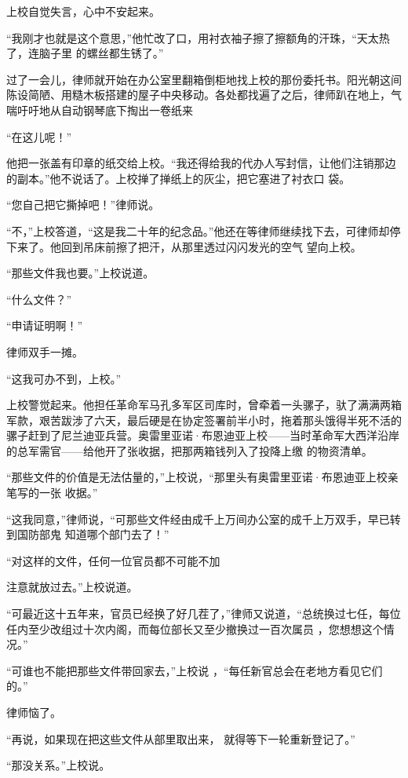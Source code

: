 \documentclass{article}
\begin{document}
上校自觉失言，心中不安起来。 

“我刚才也就是这个意思，”他忙改了口，用衬衣袖子擦了擦额角的汗珠，“天太热了，连脑子里
的螺丝都生锈了。” 

过了一会儿，律师就开始在办公室里翻箱倒柜地找上校的那份委托书。阳光朝这间陈设简陋、用糙木板搭建的屋子中央移动。各处都找遍了之后，律师趴在地上，气喘吁吁地从自动钢琴底下掏出一卷纸来

\newpage


“在这儿呢！” 

他把一张盖有印章的纸交给上校。“我还得给我的代办人写封信，让他们注销那边的副本。”他不说话了。上校掸了掸纸上的灰尘，把它塞进了衬衣口
袋。 


“您自己把它撕掉吧！”律师说。 

“不，”上校答道，“这是我二十年的纪念品。”他还在等律师继续找下去，可律师却停下来了。他回到吊床前擦了把汗，从那里透过闪闪发光的空气
望向上校。 


“那些文件我也要。”上校说道。 


“什么文件？” 


“申请证明啊！” 


\newpage

律师双手一摊。 


“这我可办不到，上校。” 

上校警觉起来。他担任革命军马孔多军区司库时，曾牵着一头骡子，驮了满满两箱军款，艰苦跋涉了六天，最后硬是在协定签署前半小时，拖着那头饿得半死不活的骡子赶到了尼兰迪亚兵营。奥雷里亚诺·布恩迪亚上校——当时革命军大西洋沿岸的总军需官——给他开了张收据，把那两箱钱列入了投降上缴
的物资清单。 

“那些文件的价值是无法估量的，”上校说，“那里头有奥雷里亚诺·布恩迪亚上校亲笔写的一张
收据。” 

“这我同意，”律师说，“可那些文件经由成千上万间办公室的成千上万双手，早已转到国防部鬼
知道哪个部门去了！” 

“对这样的文件，任何一位官员都不可能不加

\newpage
注意就放过去。”上校说道。 

“可最近这十五年来，官员已经换了好几茬了，”律师又说道，“总统换过七任，每位任内至少改组过十次内阁，而每位部长又至少撤换过一百次属员
，您想想这个情况。” 

“可谁也不能把那些文件带回家去，”上校说
，“每任新官总会在老地方看见它们的。” 


律师恼了。 

“再说，如果现在把这些文件从部里取出来，
就得等下一轮重新登记了。” 


“那没关系。”上校说。 
\end{document}
